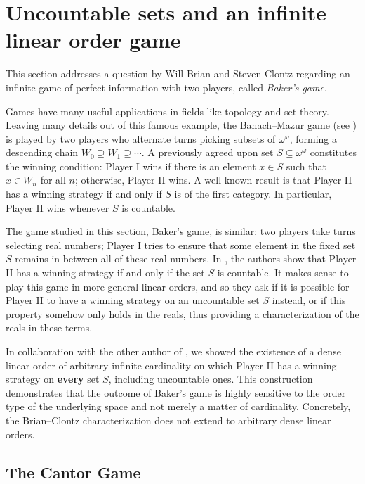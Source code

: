 
\section{Uncountable sets and an infinite linear order game}\label{sec:cantor_game}

This section addresses a question by Will Brian and Steven Clontz regarding an infinite game of perfect information with two players, called \emph{Baker's game}.

Games have many useful applications in fields like topology and set theory.
Leaving many details out of this famous example, the Banach--Mazur game (see \cite{oxtoby1957}) is played by two players who alternate turns picking subsets of $\omega^\omega$, forming a descending chain $W_0\supseteq W_1\supseteq\cdots$.
A previously agreed upon set $S\subseteq\omega^\omega$ constitutes the winning condition:
Player I wins if there is an element $x\in S$ such that $x\in W_n$ for all $n$; otherwise, Player II wins.
A well-known result is that Player II has a winning strategy if and only if $S$ is of the first category.
In particular, Player II wins whenever $S$ is countable.

The game studied in this section, Baker's game, is similar: two players take turns selecting real numbers; Player I tries to ensure that some element in the fixed set $S$ remains in between all of these real numbers.
In \cite{brian-clontz}, the authors show that Player II has a winning strategy if and only if the set $S$ is countable.
It makes sense to play this game in more general linear orders, and so they ask if it is possible for Player II to have a winning strategy on an uncountable set $S$ instead, or if this property somehow only holds in the reals, thus providing a characterization of the reals in these terms.

In collaboration with the other author of \cite{MatosWiederholdSalvetti2025}, we showed the existence of a dense linear order of arbitrary infinite cardinality on which Player II has a winning strategy on \textbf{every} set $S$, including uncountable ones.
This construction demonstrates that the outcome of Baker's game is highly sensitive to the order type of the underlying space and not merely a matter of cardinality.
Concretely, the Brian--Clontz characterization does not extend to arbitrary dense linear orders.

\subsection{The Cantor Game}

